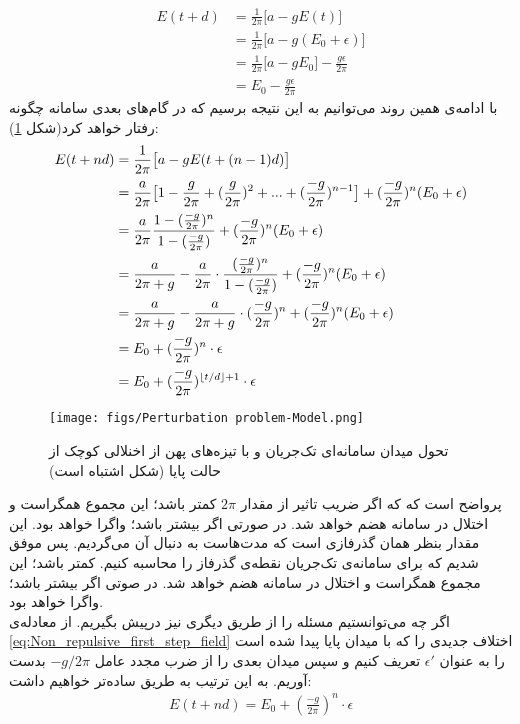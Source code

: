 \begin{align}
	E(t+d) &= \frac{1}{2\pi} \big[ a - g E(t) \big]\\
	&=  \frac{1}{2\pi} \big[ a - g (E_0 + \epsilon) \big]\\
	&=  \frac{1}{2\pi} \big[ a - g E_0 \big] - \frac{g\epsilon}{2\pi}\\
	&= E_0 - \frac{g\epsilon}{2\pi} \label{eq:Non_repulsive_first_step_field}
\end{align}
با ادامه‌ی همین روند می‌توانیم به این نتیجه برسیم که در گام‌های بعدی سامانه چگونه رفتار خواهد کرد(شکل \ref{fig:non_repulsive_single_input_perturbation}): 
\begin{align}
	E(t + nd) &= \frac{1}{2\pi} \big[ a - g E(t+(n-1)d) \big]\\
	&= \frac{a}{2\pi} \big[ 1 - \frac{g}{2\pi} + (\frac{g}{2\pi})^2 + ... + (\frac{-g}{2\pi})^{n - 1} \big] + (\frac{-g}{2\pi})^{n} (E_0 + \epsilon)
	\label{eq:geometric_sum}\\
	&= \frac{a}{2\pi} \frac{1 - (\frac{-g}{2\pi})^{n} }{ 1 - (\frac{-g}{2\pi})} + (\frac{-g}{2\pi})^{n} (E_0 + \epsilon)\\
	&= \frac{a}{2\pi + g} - \frac{a}{2\pi} \cdot \frac{ (\frac{-g}{2\pi})^{n} }{ 1 - (\frac{-g}{2\pi})} + (\frac{-g}{2\pi})^{n} (E_0 + \epsilon)\\
	&= \frac{a}{2\pi + g} - \frac{a}{2\pi + g} \cdot (\frac{-g}{2\pi})^{n} + (\frac{-g}{2\pi})^{n} (E_0 + \epsilon)\\
	&= E_0 + (\frac{-g}{2\pi})^n \cdot \epsilon\\
	&= E_0 + (\frac{-g}{2\pi})^{\left\lfloor t/d \right\rfloor + 1} \cdot \epsilon
\end{align}

\begin{figure}[h]
	\centering
	\texttt{[image: figs/Perturbation problem-Model.png]}
	\caption{
		تحول میدان سامانه‌ای تک‌جریان و با تیزه‌های پهن از اخنلالی کوچک از حالت پایا (شکل اشتباه است)
	}
	\label{fig:non_repulsive_single_input_perturbation}
\end{figure}

پرواضح است که که اگر ضریب تاثیر از مقدار 
$2\pi$
کمتر باشد؛ این مجموع همگراست و اختلال در سامانه هضم خواهد شد. در صورتی اگر بیشتر باشد؛ واگرا خواهد بود. این مقدار بنظر همان گذرفازی است که مدت‌هاست به دنبال آن می‌گردیم. پس موفق شدیم که برای سامانه‌ی تک‌جریان نقطه‌ی گذرفاز را محاسبه کنیم. کمتر باشد؛ این مجموع همگراست و اختلال در سامانه‌ هضم خواهد شد. در صوتی اگر بیشتر باشد؛ واگرا خواهد بود.\\
اگر چه می‌توانستیم مسئله را از طریق دیگری نیز درپیش بگیریم. از معادله‌ی 
\ref{eq:Non_repulsive_first_step_field}
اختلاف جدیدی را که با میدان پایا پیدا شده است را به عنوان 
$\epsilon'$
تعریف کنیم و سپس میدان بعدی را از ضرب مجدد عامل
$ - g/2\pi$
بدست آوریم. به این ترتیب به طریق ساده‌تر خواهیم داشت:
\begin{align}
	E(t+nd) = E_0 + (\frac{-g}{2\pi})^n \cdot \epsilon
\end{align}

